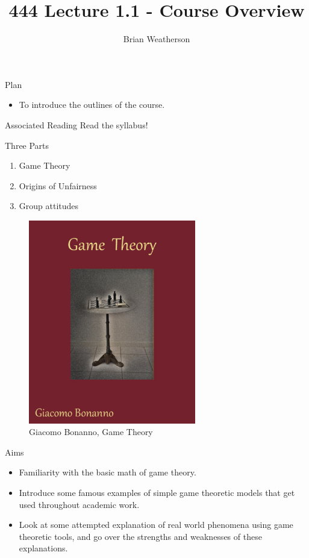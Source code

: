 \documentclass[
  ignorenonframetext,
]{beamer}
\title{444 Lecture 1.1 - Course Overview}
\author{Brian Weatherson}
\date{}
\providecommand{\tightlist}{%
  \setlength{\itemsep}{0pt}\setlength{\parskip}{0pt}}
\begin{document}
\frame{\titlepage}

\begin{frame}{Plan}
\protect\hypertarget{plan}{}
\begin{itemize}
\tightlist
\item
  To introduce the outlines of the course.
\end{itemize}
\end{frame}

\begin{frame}{Associated Reading}
\protect\hypertarget{associated-reading}{}
Read the syllabus!
\end{frame}

\begin{frame}{Three Parts}
\protect\hypertarget{three-parts}{}
\begin{enumerate}
\tightlist
\item
  Game Theory
\item
  Origins of Unfairness
\item
  Group attitudes
\end{enumerate}
\end{frame}

\begin{frame}
\begin{figure}
\centering
\includegraphics[width=0.65\textwidth,height=0.65\textheight]{images/bonanno_cover.png}
\caption{Giacomo Bonanno, Game Theory}
\end{figure}
\end{frame}

\begin{frame}{Aims}
\protect\hypertarget{aims}{}
\begin{itemize}
\tightlist
\item
  Familiarity with the basic math of game theory.
\item
  Introduce some famous examples of simple game theoretic models that
  get used throughout academic work.
\item
  Look at some attempted explanation of real world phenomena using game
  theoretic tools, and go over the strengths and weaknesses of these
  explanations.
\end{itemize}
\end{frame}
\end{document}
